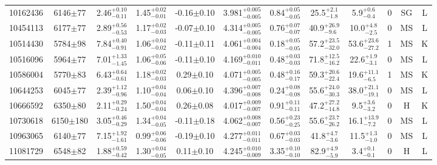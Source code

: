 \begin{longtable}{c|ccccc|ccc|ccc}
10162436 & 6146$\pm$77   & 2.46$_{-0.11}^{+0.10}$    & 1.45$_{-0.01}^{+0.02}$ & -0.16$\pm$0.10    & 3.981$_{-0.005}^{+0.005}$ & 0.84$_{-0.05}^{+0.05}$ & 25.5$_{-1.8}^{+2.1}$      & 5.9$_{-0.4}^{+0.6}$      & 0 &        SG & L \\
10454113 & 6177$\pm$77   & 2.89$_{-0.53}^{+0.56}$    & 1.17$_{-0.03}^{+0.02}$ & -0.07$\pm$0.10    & 4.314$_{-0.005}^{+0.005}$ & 0.76$_{-0.07}^{+0.07}$ & 40.9$_{-9.6}^{+26.9}$     & 10.0$_{-2.5}^{+4.8}$     & 0 &        MS & L \\
10514430 & 5784$\pm$98   & 7.84$_{-0.91}^{+0.40}$    & 1.06$_{-0.02}^{+0.04}$ & -0.11$\pm$0.11    & 4.061$_{-0.004}^{+0.004}$ & 0.18$_{-0.05}^{+0.05}$ & 57.2$_{-32.0}^{+23.5}$    & 53.6$_{-27.2}^{+23.6}$   & 1 &        MS & K \\
10516096 & 5964$\pm$77   & 7.01$_{-1.45}^{+1.33}$    & 1.06$_{-0.06}^{+0.05}$ & -0.11$\pm$0.10    & 4.169$_{-0.011}^{+0.010}$ & 0.48$_{-0.03}^{+0.03}$ & 71.8$_{-16.2}^{+12.5}$    & 22.6$_{-3.1}^{+1.9}$     & 0 &        MS & L \\
10586004 & 5770$\pm$83   & 6.43$_{-0.61}^{+0.64}$    & 1.18$_{-0.03}^{+0.02}$ & 0.29$\pm$0.10     & 4.071$_{-0.005}^{+0.005}$ & 0.48$_{-0.17}^{+0.16}$ & 59.3$_{-22.4}^{+20.6}$    & 19.6$_{-6.5}^{+11.1}$    & 1 &        MS & K \\
10644253 & 6045$\pm$77   & 2.39$_{-0.96}^{+1.12}$    & 1.10$_{-0.04}^{+0.04}$ & 0.06$\pm$0.10     & 4.396$_{-0.008}^{+0.007}$ & 0.24$_{-0.08}^{+0.08}$ & 55.6$_{-30.3}^{+24.0}$    & 38.0$_{-19.1}^{+21.1}$   & 0 &        MS & L \\
10666592 & 6350$\pm$80   & 2.11$_{-0.24}^{+0.29}$    & 1.50$_{-0.04}^{+0.04}$ & 0.26$\pm$0.08     & 4.017$_{-0.007}^{+0.009}$ & 0.91$_{-0.11}^{+0.11}$ & 47.2$_{-14.8}^{+27.2}$    & 9.5$_{-3.2}^{+3.6}$      & 0 &        H & K \\
10730618 & 6150$\pm$180  & 3.05$_{-0.29}^{+0.46}$    & 1.34$_{-0.05}^{+0.04}$ & -0.11$\pm$0.18    & 4.062$_{-0.007}^{+0.008}$ & 0.56$_{-0.25}^{+0.23}$ & 55.6$_{-26.2}^{+23.7}$    & 16.1$_{-7.2}^{+13.9}$    & 0 &        MS & L \\
10963065 & 6140$\pm$77   & 7.15$_{-1.61}^{+1.92}$    & 0.99$_{-0.06}^{+0.06}$ & -0.19$\pm$0.10    & 4.277$_{-0.011}^{+0.011}$ & 0.67$_{-0.03}^{+0.03}$ & 41.8$_{-3.6}^{+4.7}$      & 11.5$_{-1.0}^{+1.3}$     & 0 &        MS & L \\
11081729 & 6548$\pm$82   & 1.88$_{-0.42}^{+0.59}$    & 1.30$_{-0.05}^{+0.04}$ & 0.11$\pm$0.10     & 4.245$_{-0.009}^{+0.010}$ & 3.35$_{-0.10}^{+0.10}$ & 82.9$_{-5.9}^{+4.9}$      & 3.4$_{-0.1}^{+0.1}$      & 0 &        H & L \\

\end{longtable}
